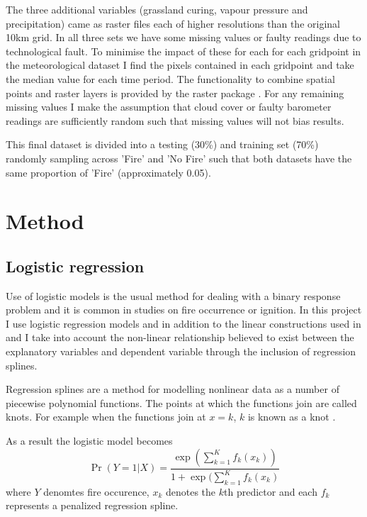 \documentclass[11pt,a4paper]{article}
\begin{document}
The three additional variables (grassland curing, vapour pressure and precipitation) came as raster files each of higher resolutions than the original 10km grid. In all three sets we have some missing values or faulty readings due to technological fault. To minimise the impact of these for each for each gridpoint in the meteorological dataset I find the pixels contained in each gridpoint and take the median value for each time period. The functionality to combine spatial points and raster layers is provided by the raster package \citep{raster}. For any remaining missing values I make the assumption that cloud cover or faulty barometer readings are sufficiently random such that missing values will not bias results.
 

This final dataset is divided into a testing (30\%) and training set (70\%) randomly sampling across 'Fire' and 'No Fire' such that both datasets have the same proportion of 'Fire' (approximately 0.05). 

\section{Method}

\subsection{Logistic regression}

Use of logistic models is the usual method for dealing with a binary response problem and it is common in studies on fire occurrence or ignition.  In this project I use logistic regression models and in addition to the linear constructions used in \citet{andrews03} and \citet{del11} I take into account the non-linear relationship believed to exist between the explanatory variables and dependent variable through the inclusion of regression splines. 

Regression splines are a method for modelling nonlinear data as a number of piecewise  polynomial functions. The points at which the functions join are called knots. For example when the functions join at $x=k$, $k$ is known as a knot \citep{ruppert03}.

As a result the logistic model becomes
\begin{equation}
\label{eq logits}
\Pr(Y=1|X)=\frac{\exp(\sum_{k=1}^K f_k(x_k))}{1+\exp(\sum_{k=1}^K f_k(x_k)}
\end{equation}
where $Y$ denomtes fire occurence, $x_k$ denotes the $k$th predictor and each $f_k$ represents a penalized regression spline.
\end{document}
